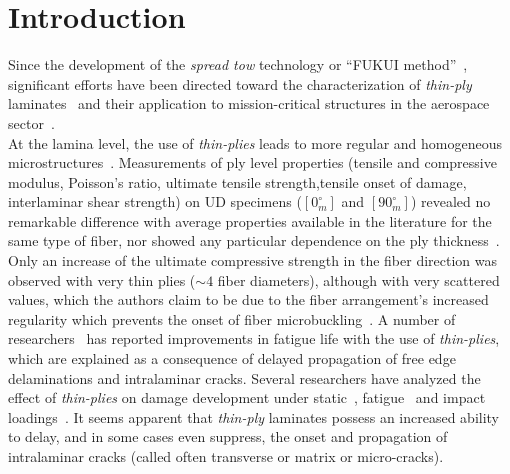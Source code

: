 \documentclass[review]{elsarticle}
\begin{document}
\linenumbers


\section{Introduction}

Since the development of the \emph{spread tow} technology or ``FUKUI method''~\cite{Kawabe2008,Kawabe2008en}, significant efforts have been directed toward the characterization of \emph{thin-ply} laminates~\cite{Sasayama2003,Yamaguchi2005,Tsai2005,Sihn2007,Yokozeki2008,Yokozeki2010,Saito2012,Arteiro2013,Arteiro2014,Amacher2014,Guillamet2014,Huang2018,Cugnoni2018} and their application to mission-critical structures in the aerospace sector~\cite{Moon2011,Kim2017,Kopp2017,McCarville2018}.\\
At the lamina level, the use of \emph{thin-plies} leads to more regular and homogeneous microstructures~\cite{Saito2012,Amacher2014}. Measurements of ply level properties (tensile and compressive modulus, Poisson's ratio, ultimate tensile strength,tensile onset of damage, interlaminar shear strength) on UD specimens ($\left[0_{m}^{\circ}\right]$ and $\left[90_{m}^{\circ}\right]$) revealed no remarkable difference with average properties available in the literature for the same type of fiber, nor showed any particular dependence on the ply thickness~\cite{Amacher2014}. Only an increase of the ultimate compressive strength in the fiber direction was observed with very thin plies ($\sim4$ fiber diameters), although with very scattered values, which the authors claim to be due to the fiber arrangement's increased regularity which prevents the onset of fiber microbuckling~\cite{Amacher2014}. A number of researchers~\cite{Yamaguchi2005,Tsai2005,Sihn2007,Yokozeki2008} has reported improvements in fatigue life with the use of \emph{thin-plies}, which are explained as a consequence of delayed propagation of free edge delaminations and intralaminar cracks. Several researchers have analyzed the effect of \emph{thin-plies} on damage development under static~\cite{Sasayama2003,Sihn2007,Yokozeki2008,Yokozeki2010,Saito2012,Arteiro2013,Arteiro2014,Amacher2014}, fatigue~\cite{Yamaguchi2005,Sihn2007,Yokozeki2008,Yokozeki2010,Amacher2014} and impact loadings~\cite{Sihn2007,Yokozeki2008,Yokozeki2010,Amacher2014}. It seems apparent that \emph{thin-ply} laminates possess an increased ability to delay, and in some cases even suppress, the onset and propagation of intralaminar cracks (called often transverse or matrix or micro-cracks).\\
\end{document}
